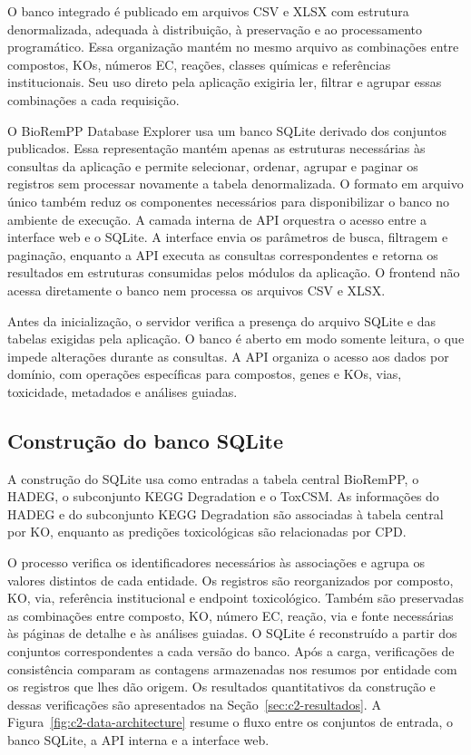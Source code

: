 O banco integrado é publicado em arquivos CSV e XLSX com estrutura
denormalizada, adequada à distribuição, à preservação e ao processamento
programático. Essa organização mantém no mesmo arquivo as combinações entre
compostos, KOs, números EC, reações, classes químicas e referências
institucionais. Seu uso direto pela aplicação exigiria ler, filtrar e agrupar
essas combinações a cada requisição.

O BioRemPP Database Explorer usa um banco SQLite derivado dos conjuntos
publicados. Essa representação mantém apenas as estruturas necessárias às
consultas da aplicação e permite selecionar, ordenar, agrupar e paginar os
registros sem processar novamente a tabela denormalizada. O formato em arquivo
único também reduz os componentes necessários para disponibilizar o banco no
ambiente de execução. A camada interna de API orquestra o acesso entre a interface web e o SQLite. A
interface envia os parâmetros de busca, filtragem e paginação, enquanto a API
executa as consultas correspondentes e retorna os resultados em estruturas
consumidas pelos módulos da aplicação. O frontend não acessa diretamente o
banco nem processa os arquivos CSV e XLSX.

Antes da inicialização, o servidor verifica a presença do arquivo SQLite e das
tabelas exigidas pela aplicação. O banco é aberto em modo somente leitura, o
que impede alterações durante as consultas. A API organiza o acesso aos dados
por domínio, com operações específicas para compostos, genes e KOs, vias,
toxicidade, metadados e análises guiadas.

\subsection{Construção do banco SQLite}

A construção do SQLite usa como entradas a tabela central BioRemPP, o HADEG,
o subconjunto KEGG Degradation e o ToxCSM. As informações do HADEG e do
subconjunto KEGG Degradation são associadas à tabela central por KO, enquanto
as predições toxicológicas são relacionadas por CPD.

O processo verifica os identificadores necessários às associações e agrupa os
valores distintos de cada entidade. Os registros são reorganizados por
composto, KO, via, referência institucional e endpoint toxicológico. Também
são preservadas as combinações entre composto, KO, número EC, reação, via e
fonte necessárias às páginas de detalhe e às análises guiadas. O SQLite é reconstruído a partir dos conjuntos correspondentes a cada versão
do banco. Após a carga, verificações de consistência comparam as contagens
armazenadas nos resumos por entidade com os registros que lhes dão origem. Os
resultados quantitativos da construção e dessas verificações são apresentados
na Seção~\ref{sec:c2-resultados}. A Figura~\ref{fig:c2-data-architecture} resume o fluxo entre os conjuntos de
entrada, o banco SQLite, a API interna e a interface web.

